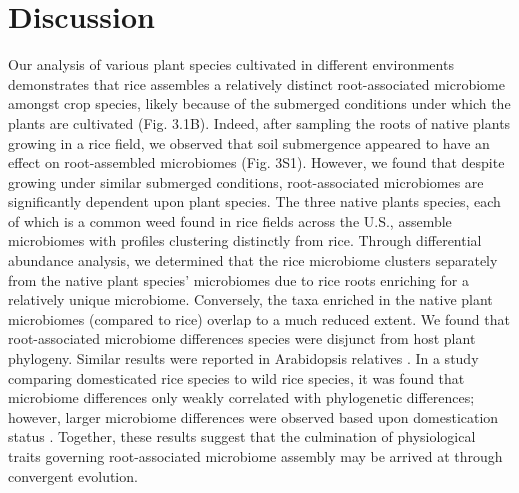 \section{Discussion}
Our analysis of various plant species cultivated in different environments demonstrates that rice assembles a relatively distinct root-associated microbiome amongst crop species, likely because of the submerged conditions under which the plants are cultivated (Fig. 3.1B). Indeed, after sampling the roots of native plants growing in a rice field, we observed that soil submergence appeared to have an effect on root-assembled microbiomes (Fig. 3S1). However, we found that despite growing under similar submerged conditions, root-associated microbiomes are significantly dependent upon plant species. The three native plants species, each of which is a common weed found in rice fields across the U.S., assemble microbiomes with profiles clustering distinctly from rice. Through differential abundance analysis, we determined that the rice microbiome clusters separately from the native plant species' microbiomes due to rice roots enriching for a relatively unique microbiome. Conversely, the taxa enriched in the native plant microbiomes (compared to rice) overlap to a much reduced extent. We found that root-associated microbiome differences species were disjunct from host plant phylogeny. Similar results were reported in Arabidopsis relatives \cite{Schlaeppi2014}. In a study comparing domesticated rice species to wild rice species, it was found that microbiome differences only weakly correlated with phylogenetic differences; however, larger microbiome differences were observed based upon domestication status \cite{Shenton2016}. Together, these results suggest that the culmination of physiological traits governing root-associated microbiome assembly may be arrived at through convergent evolution. 

